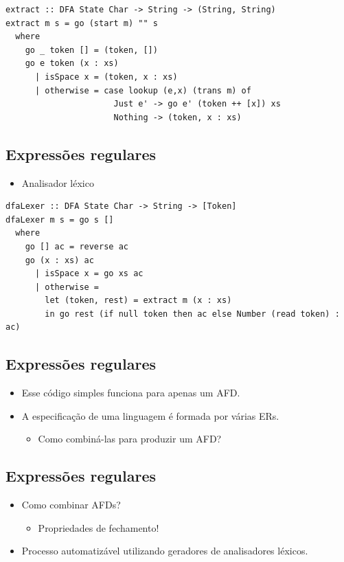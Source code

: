 \documentclass[11pt]{article}
\begin{document}
\begin{verbatim}
extract :: DFA State Char -> String -> (String, String)
extract m s = go (start m) "" s
  where
    go _ token [] = (token, [])
    go e token (x : xs)
      | isSpace x = (token, x : xs)
      | otherwise = case lookup (e,x) (trans m) of
                      Just e' -> go e' (token ++ [x]) xs
                      Nothing -> (token, x : xs)
\end{verbatim}
\subsection*{Expressões regulares}
\label{sec:org2595a70}

\begin{itemize}
\item Analisador léxico
\end{itemize}

\begin{verbatim}
dfaLexer :: DFA State Char -> String -> [Token]
dfaLexer m s = go s []
  where
    go [] ac = reverse ac
    go (x : xs) ac
      | isSpace x = go xs ac
      | otherwise =
        let (token, rest) = extract m (x : xs)
        in go rest (if null token then ac else Number (read token) : ac)
\end{verbatim}
\subsection*{Expressões regulares}
\label{sec:org1dbf551}

\begin{itemize}
\item Esse código simples funciona para apenas um AFD.

\item A especificação de uma linguagem é formada por várias ERs.
\begin{itemize}
\item Como combiná-las para produzir um AFD?
\end{itemize}
\end{itemize}
\subsection*{Expressões regulares}
\label{sec:orgf01cbf7}

\begin{itemize}
\item Como combinar AFDs?
\begin{itemize}
\item Propriedades de fechamento!
\end{itemize}

\item Processo automatizável utilizando geradores de analisadores léxicos.
\end{itemize}
\end{document}

